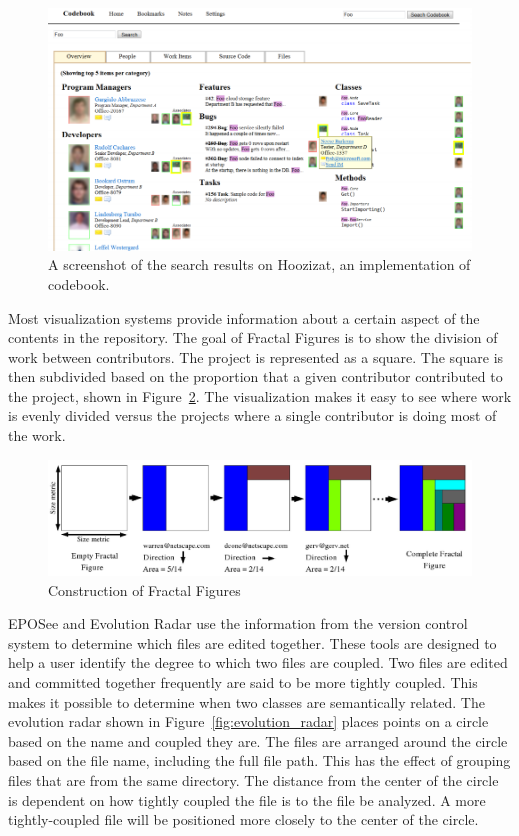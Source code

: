 \begin{figure}[htpb]
  \centering
  \includegraphics[width=0.8\linewidth]{Figures/introduction/codebook.png}
  \caption{A screenshot of the search results on Hoozizat, an
    implementation of codebook.\cite{Begel2010}}
  \label{fig:codebook}
\end{figure}

Most visualization systems provide information about a certain aspect of
the contents in the repository.
The goal of Fractal Figures\cite{Ambros2005} is to show the division of
work between contributors.
The project is represented as a square.
The square is then subdivided based on the proportion that a given
contributor contributed
to the project, shown in Figure~\ref{fig:fractal_figures}.
The visualization makes it easy to see where work is evenly divided versus
the projects where a single contributor is doing most of the work.

\begin{figure}[htpb]
  \centering
  \includegraphics[width=0.8\linewidth]{Figures/introduction/fractal_figures.png}
  \caption{Construction of Fractal Figures\cite{Ambros2005}}
  \label{fig:fractal_figures}
\end{figure}

EPOSee\cite{Burch2005} and Evolution Radar\cite{Ambros2009} use the
information from the version control system to determine which files
are edited together.
These tools  are designed to help a user identify the degree to which
two files are coupled.
Two files are edited and committed together frequently are said to be
more tightly coupled.
This makes it possible to determine when two classes are semantically
related.
The evolution radar shown in Figure~\ref{fig:evolution_radar} places
points on a circle based on the name and coupled they are.
The files are arranged around the circle
based on the file name, including the full file path. This has the
effect of grouping files that are from the same directory. The distance
from the center of the circle is dependent on how tightly coupled the
file is to the file be analyzed. A more tightly-coupled file will be
positioned more closely to the center of the circle.

